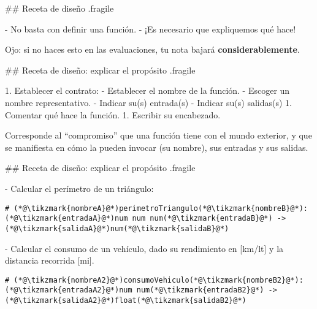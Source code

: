 ## Receta de diseño {.fragile}

- No basta con definir una función.
- ¡Es necesario que expliquemos qué hace!

\muestraRecetaDisenno{}


\pause

\bgnblockdanger
Ojo: si no haces esto en las evaluaciones, tu nota bajará \textbf{considerablemente}.
\trmblockdanger

## Receta de diseño: explicar el propósito {.fragile}


1. Establecer el contrato:
    - Establecer el nombre de la función.
        - Escoger un nombre representativo.
    - Indicar su(s) entrada(s)
    - Indicar su(s) salidas(s)
1. Comentar qué hace la función.
1. Escribir su encabezado.

\vfill

\bgnblockdefinition
{} Corresponde al ``compromiso'' que una función tiene con el mundo exterior,
y que se manifiesta en cómo la pueden invocar (su nombre), sus entradas y sus salidas.
\trmblockdefinition

## Receta de diseño: explicar el propósito {.fragile}


- Calcular el perímetro de un triángulo:

\vspace{-.5em}
\begin{lstlisting}[basicstyle=\normalsize\ttfamily]
# (*@\tikzmark{nombreA}@*)perimetroTriangulo(*@\tikzmark{nombreB}@*): (*@\tikzmark{entradaA}@*)num num num(*@\tikzmark{entradaB}@*) -> (*@\tikzmark{salidaA}@*)num(*@\tikzmark{salidaB}@*)
\end{lstlisting}


\vspace{3em}

- Calcular el consumo de un vehículo, dado su rendimiento en [km/lt] y
la distancia recorrida [mi].

\vspace{-.5em}
\begin{lstlisting}[basicstyle=\normalsize\ttfamily]
# (*@\tikzmark{nombreA2}@*)consumoVehiculo(*@\tikzmark{nombreB2}@*): (*@\tikzmark{entradaA2}@*)num num(*@\tikzmark{entradaB2}@*) -> (*@\tikzmark{salidaA2}@*)float(*@\tikzmark{salidaB2}@*)
\end{lstlisting}


